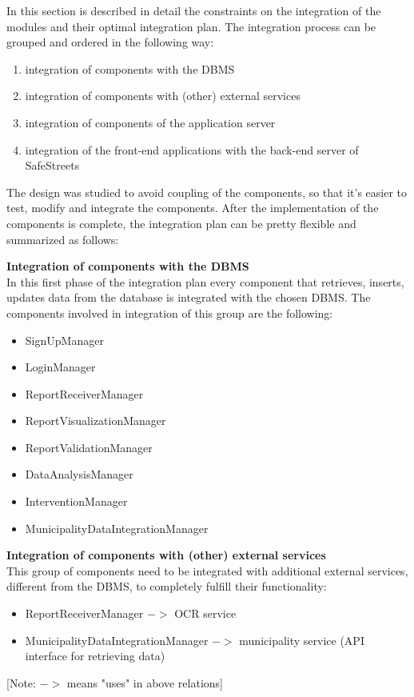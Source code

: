 In this section is described in detail the constraints on the integration of the modules and their optimal integration plan.
The integration process can be grouped and ordered in the following way:
\begin{enumerate}
	\item integration of components with the DBMS
	\item integration of components with (other) external services
	\item integration of components of the application server
	\item integration of the front-end applications with the back-end server of SafeStreets
\end{enumerate}

The design was studied to avoid coupling of the components, so that it's easier to test, modify and integrate the components. After the implementation of the components is complete, the integration plan can be pretty flexible and summarized as follows:

\textbf{Integration of components with the DBMS}\\
In this first phase of the integration plan every component that retrieves, inserts, updates data from the database is integrated with the chosen DBMS. The components involved in integration of this group are the following:
\begin{itemize}
	\item SignUpManager
	\item LoginManager
	\item ReportReceiverManager
	\item ReportVisualizationManager
	\item ReportValidationManager
	\item DataAnalysisManager
	\item InterventionManager
	\item MunicipalityDataIntegrationManager
\end{itemize} 

\textbf{Integration of components with (other) external services}\\
This group of components need to be integrated with additional external services, different from the DBMS, to completely fulfill their functionality:
\begin{itemize}
	\item ReportReceiverManager $ -> $ OCR service
	\item MunicipalityDataIntegrationManager $ -> $ municipality service (API interface for retrieving data)
\end{itemize}
[Note: $ -> $ means "uses" in above relations]

